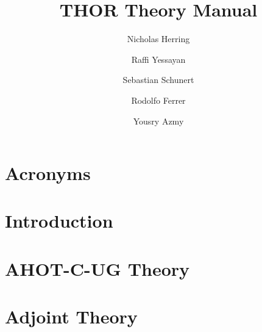\documentclass[twoside]{report}
\title{THOR Theory Manual}
\author[1]{Nicholas Herring}
\author[1]{Raffi Yessayan}
\author[2]{Sebastian Schunert}
\author[3]{Rodolfo Ferrer}
\author[1]{Yousry Azmy}
\affil[1]{North Carolina State University}
\affil[2]{Idaho National Laboratory}
\affil[3]{The Pennsylvania State University}
\begin{document}



%

\chapter*{Acronyms}


\tableofcontents


\clearpage
{}
\pagestyle{fancy}

\chapter{Introduction}



\chapter{AHOT-C-UG Theory}



\chapter{Adjoint Theory}






\end{document}
